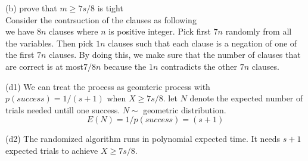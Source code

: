 \documentclass[11pt]{article}
\begin{document}
\begin{enumerate}
(b) prove that $m \geq 7s/8$ is tight\\
Consider the contrsuction of the clauses as following\\
we have $8n$ clauses where $n$ is positive integer. Pick first $7n$ randomly from all the variables. Then pick $1n$ clauses such that each clause is a negation of one of the first $7n$ clauses. By doing this, we make sure that the number of clauses that are correct is at most$7/8n$ because the $1n$ contradicts the other $7n$ clauses. 

(d1)
We can treat the process as geomteric process with $p(success) = 1/(s+1)$ when $X \geq 7s/8$. let $N$ denote the expected number of trials needed untill one success. $N \sim$ geometric distribution.
\[E(N) = 1/p(success) = (s+1)\]

(d2)
The randomized algorithm runs in polynomial expected time. It needs $ s+1 $ expected trials to achieve $ X \geq 7s/8$.  





\end{enumerate}
\end{document}
